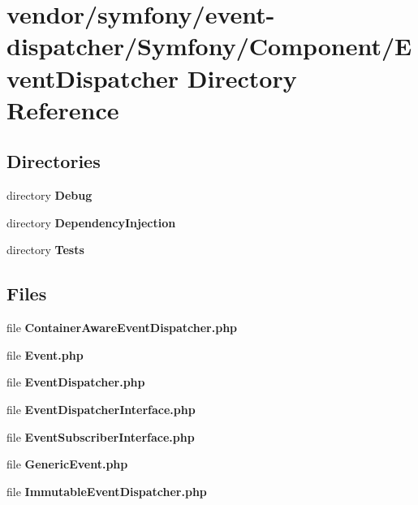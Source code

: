 \section{vendor/symfony/event-\/dispatcher/\+Symfony/\+Component/\+Event\+Dispatcher Directory Reference}
\label{dir_e119df05cf41ad6d32f7da9f11656b40}
\subsection*{Directories}
\begin{DoxyCompactItemize}
\item 
directory {\bf Debug}
\item 
directory {\bf Dependency\+Injection}
\item 
directory {\bf Tests}
\end{DoxyCompactItemize}
\subsection*{Files}
\begin{DoxyCompactItemize}
\item 
file {\bf Container\+Aware\+Event\+Dispatcher.\+php}
\item 
file {\bf Event.\+php}
\item 
file {\bf Event\+Dispatcher.\+php}
\item 
file {\bf Event\+Dispatcher\+Interface.\+php}
\item 
file {\bf Event\+Subscriber\+Interface.\+php}
\item 
file {\bf Generic\+Event.\+php}
\item 
file {\bf Immutable\+Event\+Dispatcher.\+php}
\end{DoxyCompactItemize}
